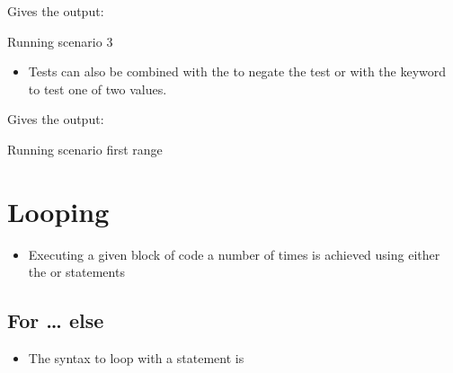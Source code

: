 \documentclass[letterpaper,10pt,english,openany]{sphinxmanual}
\begin{document}
Gives the output:

\begin{sphinxVerbatim}[commandchars=\\\{\}]
Running scenario 3
\end{sphinxVerbatim}
\begin{itemize}
\item {} 
Tests can also be combined with the  to negate the test or
with the  keyword to test one of two values.

\end{itemize}

\begin{sphinxVerbatim}[commandchars=\\\{\}]
  
       
\end{sphinxVerbatim}

Gives the output:

\begin{sphinxVerbatim}[commandchars=\\\{\}]
Running scenario first range
\end{sphinxVerbatim}



\section{Looping}
\label{\detokenize{introduction_to_python/looping:looping}}\label{\detokenize{introduction_to_python/looping:id1}}\label{\detokenize{introduction_to_python/looping::doc}}\begin{itemize}
\item {} 
Executing a given block of code a number of times is achieved using
either the  or  statements

\end{itemize}


\subsection{For … else}
\label{\detokenize{introduction_to_python/looping:for-else}}\begin{itemize}
\item {} 
The syntax to loop with a  statement is

\end{itemize}
\end{document}
